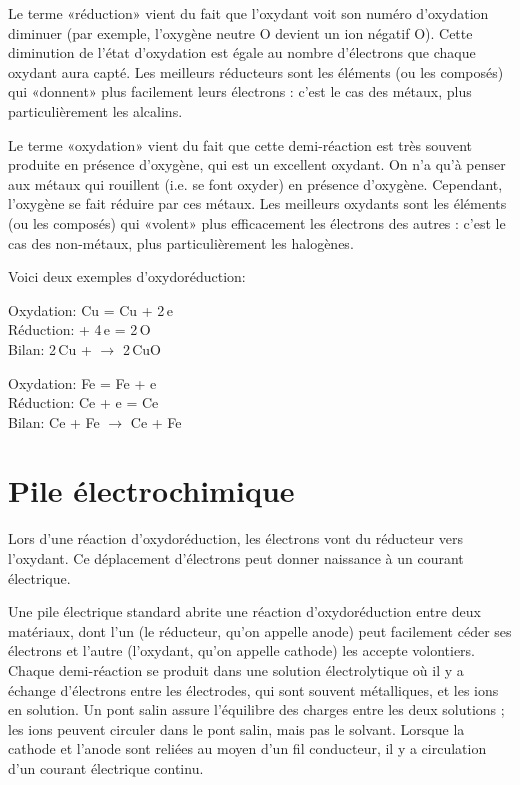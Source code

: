 \documentclass[12pt,oneside,letterpaper]{article}
\begin{document}
Le terme «réduction» vient du fait que l'oxydant voit son numéro d'oxydation diminuer (par exemple, l'oxygène neutre O devient un ion négatif O). Cette diminution de l'état d'oxydation est égale au nombre d'électrons que chaque oxydant aura capté. Les meilleurs réducteurs sont les éléments (ou les composés) qui «donnent» plus facilement leurs électrons : c'est le cas des métaux, plus particulièrement les alcalins.

Le terme «oxydation» vient du fait que cette demi-réaction est très souvent produite en présence d'oxygène, qui est un excellent oxydant. On n'a qu'à penser aux métaux qui rouillent (i.e. se font oxyder) en présence d'oxygène. Cependant, l'oxygène se fait réduire par ces métaux. Les meilleurs oxydants sont les éléments (ou les composés) qui «volent» plus efficacement les électrons des autres : c'est le cas des non-métaux, plus particulièrement les halogènes.

Voici deux exemples d'oxydoréduction:
\begin{center}
Oxydation: Cu = Cu + 2\,e\up{--}\\
Réduction:  + 4\,e\up{--} = 2\,O\\
Bilan: 2\,Cu +  $\rightarrow$ 2\,CuO
\end{center}

\begin{center}
Oxydation: Fe = Fe + e\up{--}\\
Réduction: Ce + e\up{--} = Ce\\
Bilan: Ce + Fe $\rightarrow$ Ce + Fe
\end{center}


\section{Pile électrochimique}

Lors d'une réaction d'oxydoréduction, les électrons vont du réducteur vers l'oxydant. Ce déplacement d'électrons peut donner naissance à un courant électrique.

Une pile électrique standard abrite une réaction d'oxydoréduction entre deux matériaux, dont l'un (le réducteur, qu'on appelle anode) peut facilement céder ses électrons et l'autre (l'oxydant, qu'on appelle cathode) les accepte volontiers. Chaque demi-réaction se produit dans une solution électrolytique où il y a échange d'électrons entre les électrodes, qui sont souvent métalliques, et les ions en solution. Un pont salin assure l'équilibre des charges entre les deux solutions ; les ions peuvent circuler dans le pont salin, mais pas le solvant. Lorsque la cathode et l'anode sont reliées au moyen d'un fil conducteur, il y a circulation d'un courant électrique continu.
\end{document}
